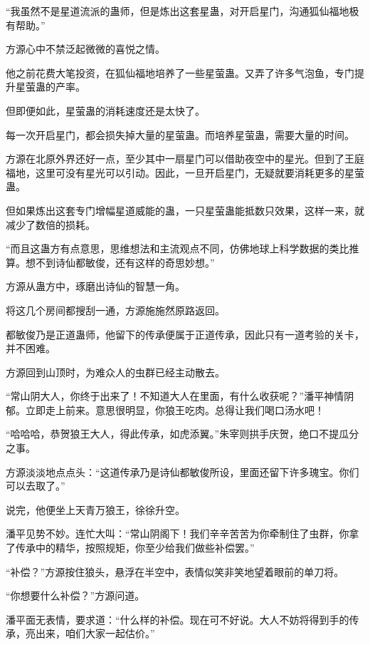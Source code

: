 
\begin{this_body}



“我虽然不是星道流派的蛊师，但是炼出这套星蛊，对开启星门，沟通狐仙福地极有帮助。”

方源心中不禁泛起微微的喜悦之情。

他之前花费大笔投资，在狐仙福地培养了一些星萤蛊。又弄了许多气泡鱼，专门提升星萤蛊的产率。

但即便如此，星萤蛊的消耗速度还是太快了。

每一次开启星门，都会损失掉大量的星萤蛊。而培养星萤蛊，需要大量的时间。

方源在北原外界还好一点，至少其中一扇星门可以借助夜空中的星光。但到了王庭福地，这里可没有星光可以引动。因此，一旦开启星门，无疑就要消耗更多的星萤蛊。

但如果炼出这套专门增幅星道威能的蛊，一只星萤蛊能抵数只效果，这样一来，就减少了数倍的损耗。

“而且这蛊方有点意思，思维想法和主流观点不同，仿佛地球上科学数据的类比推算。想不到诗仙都敏俊，还有这样的奇思妙想。”

方源从蛊方中，琢磨出诗仙的智慧一角。

将这几个房间都搜刮一通，方源施施然原路返回。

都敏俊乃是正道蛊师，他留下的传承便属于正道传承，因此只有一道考验的关卡，并不困难。

方源回到山顶时，为难众人的虫群已经主动散去。

“常山阴大人，你终于出来了！不知道大人在里面，有什么收获呢？”潘平神情阴郁。立即走上前来。意思很明显，你狼王吃肉。总得让我们喝口汤水吧！

“哈哈哈，恭贺狼王大人，得此传承，如虎添翼。”朱宰则拱手庆贺，绝口不提瓜分之事。

方源淡淡地点点头：“这道传承乃是诗仙都敏俊所设，里面还留下许多瑰宝。你们可以去取了。”

说完，他便坐上天青万狼王，徐徐升空。

潘平见势不妙。连忙大叫：“常山阴阁下！我们辛辛苦苦为你牵制住了虫群，你拿了传承中的精华，按照规矩，你至少给我们做些补偿罢。”

“补偿？”方源按住狼头，悬浮在半空中，表情似笑非笑地望着眼前的单刀将。

“你想要什么补偿？”方源问道。

潘平面无表情，要求道：“什么样的补偿。现在可不好说。大人不妨将得到手的传承，亮出来，咱们大家一起估价。”


\end{this_body}
